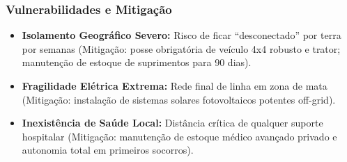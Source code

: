 \subsubsection{Vulnerabilidades e
Mitigação}

\begin{itemize}
\tightlist
\item
  \textbf{Isolamento Geográfico Severo:} Risco de ficar ``desconectado''
  por terra por semanas (Mitigação: posse obrigatória de veículo 4x4
  robusto e trator; manutenção de estoque de suprimentos para 90 dias).
\item
  \textbf{Fragilidade Elétrica Extrema:} Rede final de linha em zona de
  mata (Mitigação: instalação de sistemas solares fotovoltaicos potentes
  off-grid).
\item
  \textbf{Inexistência de Saúde Local:} Distância crítica de qualquer
  suporte hospitalar (Mitigação: manutenção de estoque médico avançado
  privado e autonomia total em primeiros socorros).
\end{itemize}

